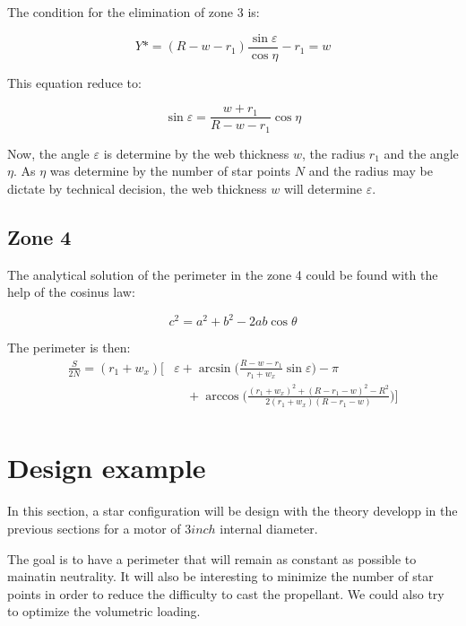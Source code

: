 \documentclass[11pt, titlepage]{article}
\begin{document}
  The condition for the elimination of zone 3 is:

\begin{equation}
  Y* = (R-w-r_1)\frac{\sin{\varepsilon}}{\cos{\eta}} - r_1 = w
\end{equation}

  This equation reduce to:

\begin{equation}
  \sin{\varepsilon} = \frac{w+r_1}{R-w-r_1}\cos{\eta}
\end{equation}

  Now, the angle $\varepsilon$ is determine by the web thickness $w$,
  the radius $r_1$ and the angle $\eta$. As $\eta$ was determine by
  the number of star points $N$ and the radius may be dictate by
  technical decision, the web thickness $w$ will determine
  $\varepsilon$.

  \subsection{Zone 4}

  The analytical solution of the perimeter in the zone 4 could be
  found with the help of the cosinus law:

\begin{equation*}
 c^2 = a^2 + b^2 - 2ab\cos{\theta}
\end{equation*}

  The perimeter is then:
\begin{equation}
\begin{split}
\frac{S}{2N} = (r_1+w_x) \biggl[ & \varepsilon +
      \arcsin{\biggl(\frac{R-w-r_1}{r_1+w_x}\sin{\varepsilon}\biggr)}
      - \pi\\
      & \quad + \arccos{\biggl(\frac{(r_1+w_x)^2+(R-r_1-w)^2-R^2}{2(r_1+w_x)(R-r_1-w)}\biggr)}
      \biggr]\\
\end{split}
\end{equation}



\section{Design example}

  In this section, a star configuration will be design with the
  theory developp in the previous sections for a motor of $3 inch$
  internal diameter.

  The goal is to have a perimeter that will remain as constant as
  possible to mainatin neutrality. It will also be interesting to
  minimize the number of star points in order to reduce the difficulty
  to cast the propellant. We could also try to optimize the volumetric
  loading.
\end{document}
